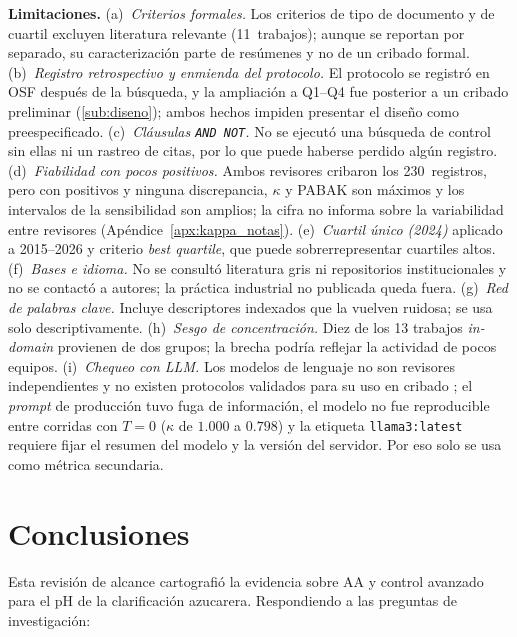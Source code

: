 \noindent\textbf{Limitaciones.}
(a)~\textit{Criterios formales.} Los criterios de tipo de documento y de
cuartil excluyen literatura relevante (11~trabajos); aunque se reportan
por separado, su caracterización parte de resúmenes y no de un cribado
formal.
(b)~\textit{Registro retrospectivo y enmienda del protocolo.} El protocolo
se registró en OSF después de la búsqueda, y la ampliación a Q1--Q4 fue
posterior a un cribado preliminar (\ref{sub:diseno}); ambos hechos
impiden presentar el diseño como preespecificado.
(c)~\textit{Cláusulas \texttt{AND~NOT}.} No se ejecutó una búsqueda de
control sin ellas ni un rastreo de citas, por lo que puede haberse
perdido algún registro.
(d)~\textit{Fiabilidad con pocos positivos.} Ambos revisores cribaron los
230~registros, pero con \NPositivosMuestra{} positivos y ninguna
discrepancia, $\kappa$ y PABAK son máximos y los intervalos de la
sensibilidad son amplios; la cifra no informa sobre la variabilidad
entre revisores (Apéndice~\ref{apx:kappa_notas}).
(e)~\textit{Cuartil único (2024)} aplicado a 2015--2026 y criterio
\textit{best quartile}, que puede sobrerrepresentar cuartiles altos.
(f)~\textit{Bases e idioma.} No se consultó literatura gris ni
repositorios institucionales y no se contactó a autores; la práctica
industrial no publicada queda fuera.
(g)~\textit{Red de palabras clave.} Incluye descriptores indexados que la
vuelven ruidosa; se usa solo descriptivamente.
(h)~\textit{Sesgo de concentración.} Diez de los 13 trabajos \textit{in-domain}
provienen de dos grupos; la brecha podría reflejar la actividad de pocos
equipos.
(i)~\textit{Chequeo con LLM.} Los modelos de lenguaje no son revisores
independientes y no existen protocolos validados para su uso en cribado
\parencite{guo2024automated,khraisha2024can}; el \textit{prompt} de
producción tuvo fuga de información, el modelo no fue reproducible entre
corridas con $T=0$ ($\kappa$ de $1.000$ a $0.798$) y la etiqueta
\texttt{llama3:latest} requiere fijar el resumen del modelo y la versión
del servidor. Por eso solo se usa como métrica secundaria.

\section{Conclusiones}
\label{sec:conclusiones}

Esta revisión de alcance cartografió la evidencia sobre AA y control
avanzado para el pH de la clarificación azucarera. Respondiendo a las
preguntas de investigación:

